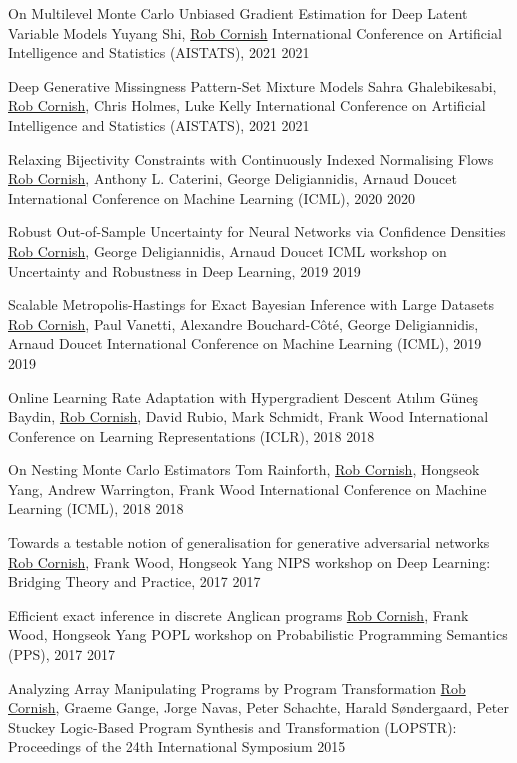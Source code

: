 \publication
    {On Multilevel Monte Carlo Unbiased Gradient Estimation for Deep Latent Variable Models}
    {Yuyang Shi, \underline{Rob Cornish}}
    {International Conference on Artificial Intelligence and Statistics (AISTATS), 2021}
    {2021}

\publication
    {Deep Generative Missingness Pattern-Set Mixture Models}
    {Sahra Ghalebikesabi, \underline{Rob Cornish}, Chris Holmes, Luke Kelly}
    {International Conference on Artificial Intelligence and Statistics (AISTATS), 2021}
    {2021}

\publication
    {Relaxing Bijectivity Constraints with Continuously Indexed Normalising Flows}
    {\underline{Rob Cornish}, Anthony L. Caterini, George Deligiannidis, Arnaud Doucet}
    {International Conference on Machine Learning (ICML), 2020}
    {2020}

\publication
    {Robust Out-of-Sample Uncertainty for Neural Networks via Confidence Densities}
    {\underline{Rob Cornish}, George Deligiannidis, Arnaud Doucet}
    {ICML workshop on Uncertainty and Robustness in Deep Learning, 2019}
    {2019}

\publication
    {Scalable Metropolis-Hastings for Exact Bayesian Inference with Large Datasets}
    {\underline{Rob Cornish}, Paul Vanetti, Alexandre Bouchard-C\^ot\'e, George Deligiannidis, Arnaud Doucet}
    {International Conference on Machine Learning (ICML), 2019}
    {2019}

\publication
    {Online Learning Rate Adaptation with Hypergradient Descent}
    {At\i l\i m G\"une\c s Baydin, \underline{Rob Cornish}, David Rubio, Mark Schmidt, Frank Wood}
    {International Conference on Learning Representations (ICLR), 2018}
    {2018}

\publication
    {On Nesting Monte Carlo Estimators}
    {Tom Rainforth, \underline{Rob Cornish}, Hongseok Yang, Andrew Warrington, Frank Wood}
    {International Conference on Machine Learning (ICML), 2018}
    {2018}

\publication
    {Towards a testable notion of generalisation for generative adversarial networks}
    {\underline{Rob Cornish}, Frank Wood, Hongseok Yang}
    {NIPS workshop on Deep Learning: Bridging Theory and Practice, 2017}
    {2017}

\publication
    {Efficient exact inference in discrete Anglican programs}
    {\underline{Rob Cornish}, Frank Wood, Hongseok Yang}
    {POPL workshop on Probabilistic Programming Semantics (PPS), 2017}
    {2017}

\publication
    {Analyzing Array Manipulating Programs by Program Transformation}
    {\underline{Rob Cornish}, Graeme Gange, Jorge Navas, Peter Schachte, Harald S\o ndergaard, Peter Stuckey}
    {Logic-Based Program Synthesis and Transformation (LOPSTR): Proceedings of the 24th International Symposium}
    {2015}
